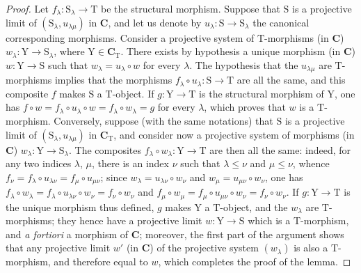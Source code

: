 \begin{proof}
Let $f_\lambda:\mathrm{S}_\lambda\to\mathrm{T}$ be the structural morphism.
Suppose that $\mathrm{S}$ is a projective limit of $(\mathrm{S}_\lambda,u_{\lambda\mu})$ in $\boldsymbol{C}$, and let us denote by $u_\lambda:\mathrm{S}\to\mathrm{S}_\lambda$ the canonical corresponding morphisms.
Consider a projective system of $\mathrm{T}$-morphisms (in $\boldsymbol{C}$) $w_\lambda:\mathrm{Y}\to\mathrm{S}_\lambda$, where $\mathrm{Y}\in\boldsymbol{C}_\mathrm{T}$.
There exists by hypothesis a unique morphism (in $\boldsymbol{C}$) $w:\mathrm{Y}\to\mathrm{S}$ such that $w_\lambda=u_\lambda\circ w$ for every $\lambda$.
The hypothesis that the $u_{\lambda\mu}$ are $\mathrm{T}$-morphisms implies that the morphisms $f_\lambda\circ u_\lambda:\mathrm{S}\to\mathrm{T}$ are all the same, and this composite $f$ makes $\mathrm{S}$ a $\mathrm{T}$-object.
If $g:\mathrm{Y}\to\mathrm{T}$ is the structural morphism of $\mathrm{Y}$, one has $f\circ w=f_\lambda\circ u_\lambda\circ w=f_\lambda\circ w_\lambda=g$ for every $\lambda$, which proves that $w$ is a $\mathrm{T}$-morphism.
Conversely, suppose (with the same notations) that $\mathrm{S}$ is a projective limit of $(\mathrm{S}_\lambda,u_{\lambda\mu})$ in $\boldsymbol{C}_\mathrm{T}$, and consider now a projective system of morphisms (in $\boldsymbol{C}$) $w_\lambda:\mathrm{Y}\to\mathrm{S}_\lambda$.
The composites $f_\lambda\circ w_\lambda:\mathrm{Y}\to\mathrm{T}$ are then all the same: indeed, for any two indices $\lambda$, $\mu$, there is an index $\nu$ such that $\lambda\leqslant\nu$ and $\mu\leqslant\nu$, whence $f_\nu=f_\lambda\circ u_{\lambda\nu}=f_\mu\circ u_{\mu\nu}$; since $w_\lambda=u_{\lambda\nu}\circ w_\nu$ and $w_\mu=u_{\mu\nu}\circ w_\nu$, one has $f_\lambda\circ w_\lambda=f_\lambda\circ u_{\lambda\nu}\circ w_\nu=f_\nu\circ w_\nu$ and $f_\mu\circ w_\mu=f_\mu\circ u_{\mu\nu}\circ w_\nu=f_\nu\circ w_\nu$.
If $g:\mathrm{Y}\to\mathrm{T}$ is the unique morphism thus defined, $g$ makes $\mathrm{Y}$ a $\mathrm{T}$-object, and the $w_\lambda$ are $\mathrm{T}$-morphisms; they hence have a projective limit $w:\mathrm{Y}\to\mathrm{S}$ which is a $\mathrm{T}$-morphism, and \emph{a fortiori} a morphism of $\boldsymbol{C}$; moreover, the first part of the argument shows that any projective limit $w'$ (in $\boldsymbol{C}$) of the projective system $(w_\lambda)$ is also a $\mathrm{T}$-morphism, and therefore equal to $w$, which completes the proof of the lemma.
\end{proof}

